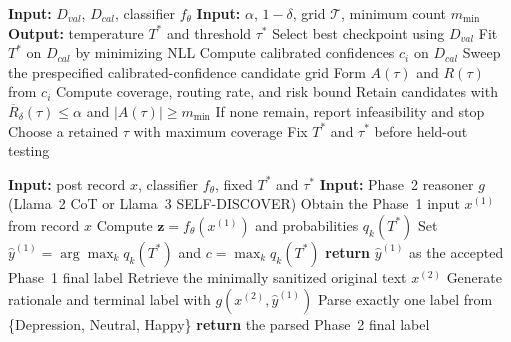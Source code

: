 \documentclass{ieeeaccess}
\begin{document}
\begin{algorithm}[t]
\caption{Calibrated confidence-guided routing}
\label{alg:confidence-routing}
\footnotesize
\begin{algorithmic}[1]
\State \textbf{Input:} $D_{val}$, $D_{cal}$, classifier $f_{\theta}$
\State \textbf{Input:} $\alpha$, $1-\delta$, grid $\mathcal{T}$, minimum count $m_{\min}$
\State \textbf{Output:} temperature $T^*$ and threshold $\tau^*$
\State Select best checkpoint using $D_{val}$
\State Fit $T^*$ on $D_{cal}$ by minimizing NLL
\State Compute calibrated confidences $c_i$ on $D_{cal}$
\State Sweep the prespecified calibrated-confidence candidate grid
    \State Form $A(\tau)$ and $R(\tau)$ from $c_i$
    \State Compute coverage, routing rate, and risk bound
\EndFor
\State Retain candidates with $\overline{R}_{\delta}(\tau)\leq\alpha$ and $|A(\tau)|\geq m_{\min}$
\State If none remain, report infeasibility and stop
\State Choose a retained $\tau$ with maximum coverage
\State Fix $T^*$ and $\tau^*$ before held-out testing
\end{algorithmic}
\end{algorithm}

\begin{algorithm}[t]
\caption{Two-phase inference with fixed calibrated routing policy}
\label{alg:two-phase-inference}
\footnotesize
\begin{algorithmic}[1]
\State \textbf{Input:} post record $x$, classifier $f_{\theta}$, fixed $T^*$ and $\tau^*$
\State \textbf{Input:} Phase~2 reasoner $g$ (Llama~2 CoT or Llama~3 SELF-DISCOVER)
\State Obtain the Phase~1 input $x^{(1)}$ from record $x$
\State Compute $\mathbf{z}=f_{\theta}(x^{(1)})$ and probabilities $q_k(T^*)$
\State Set $\hat{y}^{(1)}=\arg\max_k q_k(T^*)$ and $c=\max_k q_k(T^*)$
    \State \textbf{return} $\hat{y}^{(1)}$ as the accepted Phase~1 final label
\Else
    \State Retrieve the minimally sanitized original text $x^{(2)}$
    \State Generate rationale and terminal label with $g(x^{(2)},\hat{y}^{(1)})$
    \State Parse exactly one label from \{Depression, Neutral, Happy\}
    \State \textbf{return} the parsed Phase~2 final label
\EndIf
\end{algorithmic}
\end{algorithm}
\end{document}
